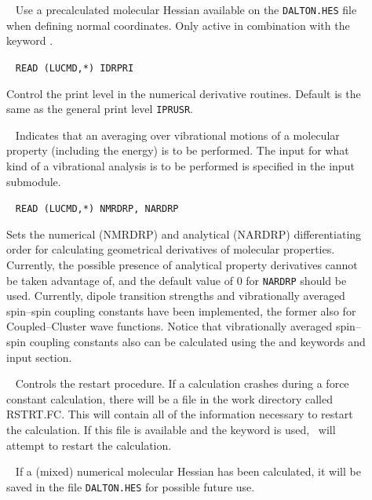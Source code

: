 \begin{description}
\item[]\verb| |\newline
Use a precalculated molecular Hessian available on the \verb|DALTON.HES| file
when defining normal coordinates. Only active in combination with the
keyword .

\item[]\verb| |\newline
\verb|READ (LUCMD,*) IDRPRI|

Control the print level in the numerical derivative routines. Default
is the same as the general print level \verb|IPRUSR|.

\item[]\verb| |\newline
Indicates that an averaging over vibrational motions of a molecular
property (including the energy) is to be performed. The input
for what kind of a vibrational analysis is to be performed is
specified in the  input submodule.

\item[]\verb| |\newline
\verb|READ (LUCMD,*) NMRDRP, NARDRP|

Sets the numerical (NMRDRP) and analytical (NARDRP) differentiating
order for calculating geometrical derivatives of molecular
properties. Currently, the possible presence of analytical property
derivatives cannot be taken advantage of, and the default value of $0$
for \verb|NARDRP| should be used. Currently, dipole transition
strengths and vibrationally averaged spin--spin coupling constants
have been implemented, the former also for Coupled--Cluster wave
functions. Notice that vibrationally
averaged spin--spin coupling constants also can be calculated using
the  and  keywords and input section.

\item[]\ \newline
Controls the restart procedure. If a calculation crashes during a
force constant calculation, there will be a file in the work directory
called RSTRT.FC. This will contain all of the information necessary to
restart the calculation. If this file is available and the keyword is
used, \dalton\ will attempt to restart the calculation.

\item[]\verb| |\newline
If a (mixed) numerical molecular Hessian has been calculated, it will be saved
in the file \verb|DALTON.HES| for possible future use.


\end{description}
